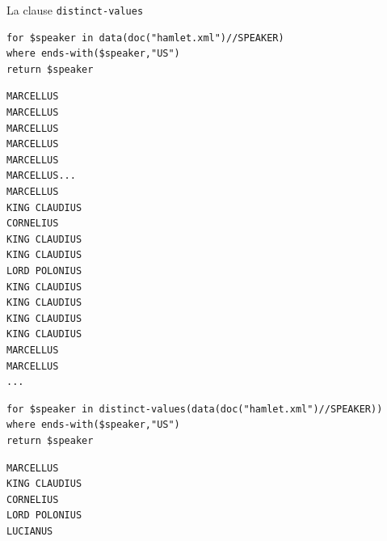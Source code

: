 \begin{frame}{La clause \texttt{distinct-values}}

\begin{lstlisting}
for $speaker in data(doc("hamlet.xml")//SPEAKER)
where ends-with($speaker,"US")
return $speaker
\end{lstlisting}


\begin{lstlisting}[language=XML,basicstyle=\tiny]
MARCELLUS
MARCELLUS
MARCELLUS
MARCELLUS
MARCELLUS
MARCELLUS...
MARCELLUS
KING CLAUDIUS
CORNELIUS
KING CLAUDIUS
KING CLAUDIUS
LORD POLONIUS
KING CLAUDIUS
KING CLAUDIUS
KING CLAUDIUS
KING CLAUDIUS
MARCELLUS
MARCELLUS
...
\end{lstlisting} 

\framebreak

\begin{lstlisting}
for $speaker in distinct-values(data(doc("hamlet.xml")//SPEAKER))
where ends-with($speaker,"US")
return $speaker
\end{lstlisting}


\begin{lstlisting}[language=XML,basicstyle=\tiny]
MARCELLUS
KING CLAUDIUS
CORNELIUS
LORD POLONIUS
LUCIANUS
\end{lstlisting} 


\end{frame}

